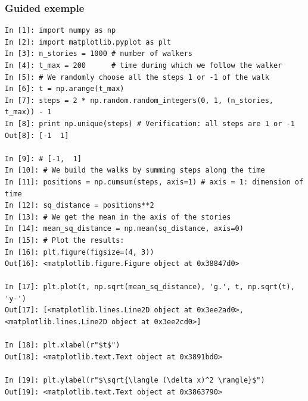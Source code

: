 \documentclass[colorlinks]{beamer}
\begin{document}
\begin{frame}[fragile]\frametitle{Guided exemple}
\tiny
\begin{verbatim}
In [1]: import numpy as np 
In [2]: import matplotlib.pyplot as plt 
In [3]: n_stories = 1000 # number of walkers 
In [4]: t_max = 200      # time during which we follow the walker 
In [5]: # We randomly choose all the steps 1 or -1 of the walk 
In [6]: t = np.arange(t_max) 
In [7]: steps = 2 * np.random.random_integers(0, 1, (n_stories, t_max)) - 1 
In [8]: print np.unique(steps) # Verification: all steps are 1 or -1 
Out[8]: [-1  1]

In [9]: # [-1,  1] 
In [10]: # We build the walks by summing steps along the time 
In [11]: positions = np.cumsum(steps, axis=1) # axis = 1: dimension of time 
In [12]: sq_distance = positions**2 
In [13]: # We get the mean in the axis of the stories 
In [14]: mean_sq_distance = np.mean(sq_distance, axis=0) 
In [15]: # Plot the results: 
In [16]: plt.figure(figsize=(4, 3)) 
Out[16]: <matplotlib.figure.Figure object at 0x38847d0>

In [17]: plt.plot(t, np.sqrt(mean_sq_distance), 'g.', t, np.sqrt(t), 'y-') 
Out[17]: [<matplotlib.lines.Line2D object at 0x3ee2ad0>, <matplotlib.lines.Line2D object at 0x3ee2cd0>]

In [18]: plt.xlabel(r"$t$") 
Out[18]: <matplotlib.text.Text object at 0x3891bd0>

In [19]: plt.ylabel(r"$\sqrt{\langle (\delta x)^2 \rangle}$") 
Out[19]: <matplotlib.text.Text object at 0x3863790>

\end{verbatim}

\end{frame}
\end{document}
